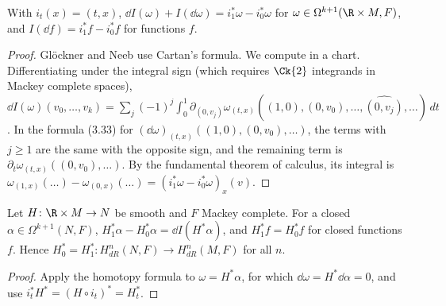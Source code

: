 \begin{theorem}
  \label{thm:homotopy-formula}
  \leanok
  With $i_t(x) = (t, x)$, $\dd I(\omega) + I(\dd\omega) = i_1^*\omega - i_0^*\omega$ for
  $\omega \in \Omega^{k+1}(\R \times M, F)$, and $I(\dd f) = i_1^* f - i_0^* f$ for functions $f$.
\end{theorem}

\begin{proof}
  \leanok
  Glöckner and Neeb use Cartan's formula. We compute in a chart. Differentiating under the
  integral sign (which requires $\Ck{2}$ integrands in Mackey complete spaces),
  $\dd I(\omega)(v_0, \dots, v_k) = \sum_j (-1)^j \int_0^1 \partial_{(0, v_j)}
  \omega_{(t,x)}((1,0), (0, v_0), \dots, \widehat{(0, v_j)}, \dots)\, dt$. In the formula (3.33)
  for $(\dd\omega)_{(t,x)}((1, 0), (0, v_0), \dots)$, the terms with $j \geq 1$ are the same with
  the opposite sign, and the remaining term is $\partial_t \omega_{(t,x)}((0, v_0), \dots)$. By the
  fundamental theorem of calculus, its integral is $\omega_{(1, x)}(\dots) - \omega_{(0,
  x)}(\dots) = (i_1^*\omega - i_0^*\omega)_x(v)$.
\end{proof}

\begin{theorem}
  \label{thm:homotopy-lemma}
  \leanok
  Let $H \colon \R \times M \to N$ be smooth and $F$ Mackey complete. For a closed $\alpha \in
  \Omega^{k+1}(N, F)$, $H_1^*\alpha - H_0^*\alpha = \dd I(H^*\alpha)$, and $H_1^* f = H_0^* f$ for
  closed functions $f$. Hence $H_0^* = H_1^* \colon H^n_{dR}(N, F) \to H^n_{dR}(M, F)$ for all $n$.
\end{theorem}

\begin{proof}
  \leanok
  Apply the homotopy formula to $\omega = H^*\alpha$, for which $\dd\omega = H^*\dd\alpha = 0$, and
  use $i_t^* H^* = (H \circ i_t)^* = H_t^*$.
\end{proof}

